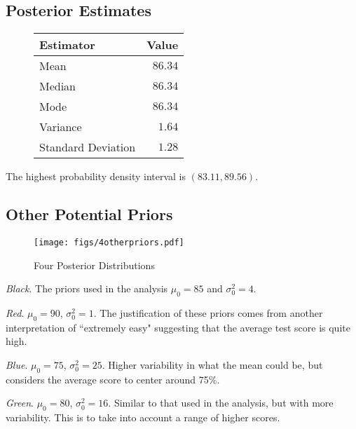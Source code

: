 \documentclass[12pt]{article}
\begin{document}
\subsection{Posterior Estimates}

\begin{figure}[H]
\begin{center}
\begin{tabular}{l|r}
Estimator & \multicolumn{1}{l}{Value} \\ \hline \hline
Mean               & $86.34$ \\
Median             & $86.34$ \\
Mode               & $86.34$ \\
Variance           & $1.64$ \\
Standard Deviation & $1.28$ \\
\end{tabular}
\end{center}
\end{figure}

\noindent The highest probability density interval is $(83.11, 89.56)$.


\subsection{Other Potential Priors}

\begin{figure}[H]
\begin{center}
\texttt{[image: figs/4otherpriors.pdf]}
\caption{Four Posterior Distributions}
\end{center}
\end{figure}

\noindent \textit{Black}.  The priors used in the analysis $\mu_0=85$ and $\sigma_0^2=4$.

\noindent \textit{Red}. $\mu_0=90$, $\sigma_0^2=1$.  The justification of these priors comes from another interpretation of ``extremely easy" suggesting that the average test score is quite high.

\noindent \textit{Blue}. $\mu_0=75$, $\sigma_0^2=25$.  Higher variability in what the mean could be, but considers the average score to center around 75\%.

\noindent \textit{Green}. $\mu_0=80$, $\sigma_0^2=16$.  Similar to that used in the analysis, but with more variability.  This is to take into account a range of higher scores.

%
\end{document}
